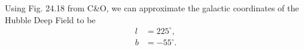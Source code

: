\documentclass[11pt,letterpaper]{article}
\begin{document}

% 
% 
% 
% 

Using Fig. 24.18 from C\&O, we can approximate the galactic coordinates of the Hubble Deep Field to be
\begin{align*}
    l &= 225^\circ, \\
    b &= -55^\circ.
\end{align*} 
\end{document}
